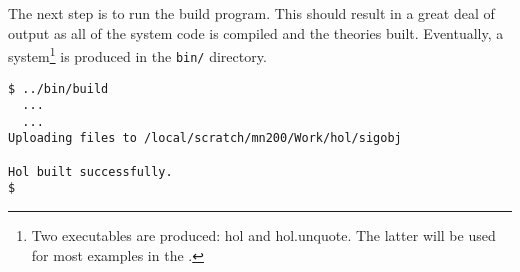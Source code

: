 \noindent The next step is to run the \textsf{build} program.  This should
result in a great deal of output as all of the system code is compiled
and the theories built.  Eventually, a \HOL{} system\footnote{Two
  executables are produced: \textsf{hol} and \textsf{hol.unquote}.  The
  latter will be used for most examples in the \TUTORIAL{}.} is
produced in the \texttt{bin/} directory.

\begin{session}
\begin{verbatim}
$ ../bin/build
  ...
  ...
Uploading files to /local/scratch/mn200/Work/hol/sigobj

Hol built successfully.
$
\end{verbatim}
\end{session}



